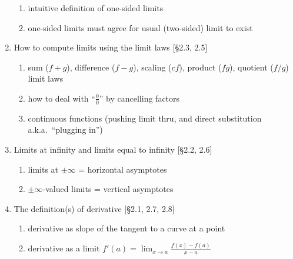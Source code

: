 \documentclass[11pt]{article}
\begin{document}
\begin{enumerate}
\begin{enumerate}
\item intuitive definition of one-sided limits
\item one-sided limits must agree for usual (two-sided) limit to exist
\end{enumerate}
\item How to compute limits using the limit laws [\S2.3, 2.5]
\begin{enumerate}
\item sum ($f+g$), difference ($f-g$), scaling ($cf$), product ($fg$), quotient ($f/g$) limit laws
\item how to deal with ``$\frac{0}{0}$'' by cancelling factors
\item continuous functions (pushing limit thru, and direct substitution a.k.a.~``plugging in'')
\end{enumerate}
\item Limits at infinity and limits equal to infinity [\S2.2, 2.6]
\begin{enumerate}
\item limits at $\pm \infty$ = horizontal asymptotes
\item $\pm \infty$-valued limits = vertical asymptotes
\end{enumerate}
\item The definition(s) of derivative [\S2.1, 2.7, 2.8]
\begin{enumerate}
\item derivative as slope of the tangent to a curve at a point
\item derivative as a limit $f'(a) = \displaystyle \lim_{x \to a} \frac{f(x)-f(a)}{x-a}$
\end{enumerate}
\end{enumerate}
\end{document}
